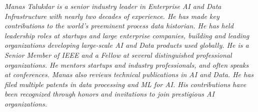 {\selectfont
	\begin{justify}\textit{Manas Talukdar is a senior industry leader in Enterprise AI and Data Infrastructure with nearly two decades of experience. He has made key contributions to the world's preeminent process data historian. He has held leadership roles at startups and large enterprise companies, building and leading organizations developing large-scale AI and Data products used globally. He is a Senior Member of IEEE and a Fellow at several distinguished professional organizations. He mentors startups and industry professionals, and often speaks at conferences. Manas also reviews technical publications in AI and Data. He has filed multiple patents in data processing and ML for AI. His contributions have been recognized through honors and invitations to join prestigious AI organizations.}\end{justify}
}
\vspace{-12pt}